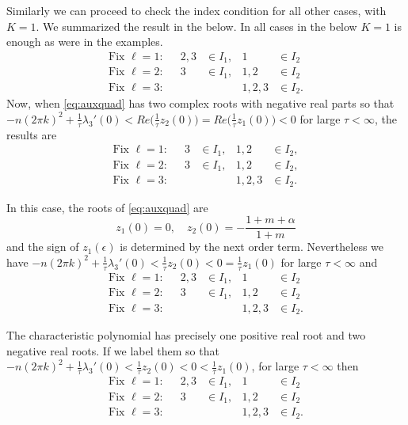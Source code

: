\documentclass[a4paper,11pt]{article}
\theoremstyle{remark}
\begin{document}
 Similarly we can proceed to check the index condition for all other cases, with $K=1$.
We summarized the result in the below. In all cases in the below $K=1$ is enough as were in the examples.
\begin{align*}
  \text{Fix $\ell=1$:}&& 2,3&\in I_1, & 1&\in I_2\\
  \text{Fix $\ell=2$:}&& 3&\in I_1, & 1,2&\in I_2\\
  \text{Fix $\ell=3$:}&& & & 1,2,3&\in I_2.
\end{align*}
Now, when \eqref{eq:auxquad} has two complex roots with negative real parts so that $-n(2\pi k)^2 + \frac{1}{\tau}\lambda_3'(0)<Re\Big(\frac{1}{\tau}z_2(0)\Big)=Re\Big(\frac{1}{\tau}z_1(0)\Big)<0$ for large $\tau<\infty$, the results are
\begin{align*}
  \text{Fix $\ell=1$:}&& 3&\in I_1, & 1,2&\in I_2,\\
  \text{Fix $\ell=2$:}&& 3&\in I_1, & 1,2&\in I_2,\\
  \text{Fix $\ell=3$:}&& & & 1,2,3&\in I_2.
\end{align*}


 In this case, the roots of \eqref{eq:auxquad} are
$$ z_1(0)=0, \quad z_2(0) = -\frac{1+m+\alpha}{1+m}$$
and the sign of $z_1(\epsilon)$ is determined by the next order term. Nevertheless we have
$-n(2\pi k)^2 + \frac{1}{\tau}\lambda_3'(0)<\frac{1}{\tau}z_2(0)<0=\frac{1}{\tau}z_1(0)$ for large $\tau<\infty$ and
\begin{align*}
  \text{Fix $\ell=1$:}&& 2,3&\in I_1, & 1&\in I_2\\
  \text{Fix $\ell=2$:}&& 3&\in I_1, & 1,2&\in I_2\\
  \text{Fix $\ell=3$:}&& & & 1,2,3&\in I_2.
\end{align*}

The characteristic polynomial has precisely one positive real root and two negative real roots. If we label them so that
$-n(2\pi k)^2 + \frac{1}{\tau}\lambda_3'(0)<\frac{1}{\tau}z_2(0)<0<\frac{1}{\tau}z_1(0)$, for large $\tau<\infty$ then
\begin{align*}
  \text{Fix $\ell=1$:}&& 2,3&\in I_1, & 1&\in I_2\\
  \text{Fix $\ell=2$:}&& 3&\in I_1, & 1,2&\in I_2\\
  \text{Fix $\ell=3$:}&& & & 1,2,3&\in I_2.
\end{align*}
\end{document}
